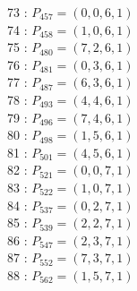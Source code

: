 \documentclass{article}
\begin{document}
{\begin{multicols}{3}
73 : $P_{457}=( 0, 0, 6, 1 )$\\
74 : $P_{458}=( 1, 0, 6, 1 )$\\
75 : $P_{480}=( 7, 2, 6, 1 )$\\
76 : $P_{481}=( 0, 3, 6, 1 )$\\
77 : $P_{487}=( 6, 3, 6, 1 )$\\
78 : $P_{493}=( 4, 4, 6, 1 )$\\
79 : $P_{496}=( 7, 4, 6, 1 )$\\
80 : $P_{498}=( 1, 5, 6, 1 )$\\
81 : $P_{501}=( 4, 5, 6, 1 )$\\
82 : $P_{521}=( 0, 0, 7, 1 )$\\
83 : $P_{522}=( 1, 0, 7, 1 )$\\
84 : $P_{537}=( 0, 2, 7, 1 )$\\
85 : $P_{539}=( 2, 2, 7, 1 )$\\
86 : $P_{547}=( 2, 3, 7, 1 )$\\
87 : $P_{552}=( 7, 3, 7, 1 )$\\
88 : $P_{562}=( 1, 5, 7, 1 )$\\
\end{multicols}


%


%


}%
\end{document}
